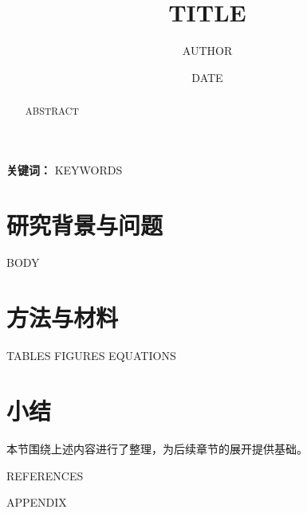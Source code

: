 \documentclass[UTF8,a4paper,zihao=-4]{ctexart}
\title{{{TITLE}}}
\author{{{AUTHOR}}}
\date{{{DATE}}}
\begin{document}
\maketitle

\begin{abstract}
{{ABSTRACT}}
\end{abstract}

\noindent\textbf{关键词：} {{KEYWORDS}}

\section{研究背景与问题}
{{BODY}}

\section{方法与材料}
{{TABLES}}
{{FIGURES}}
{{EQUATIONS}}

\section{小结}
本节围绕上述内容进行了整理，为后续章节的展开提供基础。

{{REFERENCES}}

{{APPENDIX}}
\end{document}
